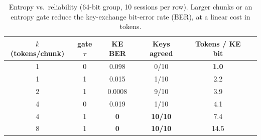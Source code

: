 \begin{table}[t]
\centering
\caption{Entropy vs.\ reliability (64-bit group, 10 sessions per row). Larger chunks or an entropy gate reduce the key-exchange bit-error rate (BER), at a linear cost in tokens.}
\label{tab:sweep}
\small
\begin{tabular}{@{}cccccc@{}}
\toprule
$k$ (tokens/chunk) & gate $\tau$ & KE BER & Keys agreed & Tokens / KE bit \\
\midrule
1 & 0 & 0.098 & 0/10 & {\bf 1.0} \\
1 & 1 & 0.015 & 1/10 & 2.2 \\
2 & 1 & 0.0008 & 9/10 & 3.9 \\
4 & 0 & 0.019 & 1/10 & 4.1 \\
4 & 1 & {\bf 0} & {\bf 10/10} & 7.4 \\
8 & 1 & {\bf 0} & {\bf 10/10} & 14.5 \\
\bottomrule
\end{tabular}
\end{table}
